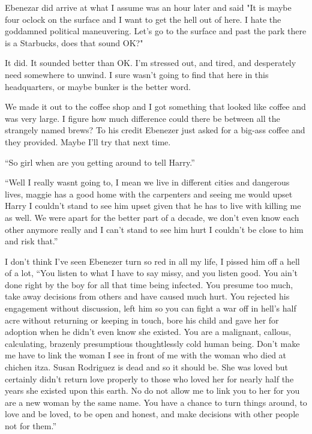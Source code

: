 Ebenezar did arrive at what I assume was an hour later and said "It is maybe four oclock on the surface and I want to get the hell out of here. I hate the goddamned political maneuvering. Let's go to the surface and past the park there is a Starbucks, does that sound OK?"

It did. It sounded better than OK. I'm stressed out, and tired, and desperately need somewhere to unwind. I sure wasn't going to find that here in this headquarters, or maybe bunker is the better word.

We made it out to the coffee shop and I got something that looked like coffee and was very large. I figure how much difference could there be between all the strangely named brews? To his credit Ebenezer just asked for a big-ass coffee and they provided. Maybe I'll try that next time.

``So girl when are you getting around to tell Harry.''

``Well I really wasnt going to, I mean we live in different cities and dangerous lives, maggie has a good home with the carpenters and seeing me would upset Harry I couldn't stand to see him upset given that he has to live with killing me as well. We were apart for the better part of a decade, we don't even know each other anymore really and I can't stand to see him hurt I couldn't be close to him and risk that.''

I don't think I've seen Ebenezer turn so red in all my life, I pissed him off a hell of a lot, ``You listen to what I have to say missy, and you listen good. You ain't done right by the boy for all that time being infected. You presume too much, take away decisions from others and have caused much hurt. You rejected his engagement without discussion, left him so you can fight a war off in hell's half acre without returning or keeping in touch, bore his child and gave her for adoption when he didn't even know she existed. You are a malignant, callous, calculating, brazenly presumptious thoughtlessly cold human being. Don't make me have to link the woman I see in front of me with the woman who died at chichen itza. Susan Rodriguez is dead and so it should be. She was loved but certainly didn't return love properly to those who loved her for nearly half the years she existed upon this earth. No do not allow me to link you to her for you are a new woman by the same name. You have a chance to turn things around, to love and be loved, to be open and honest, and make decisions with other people not for them.''

